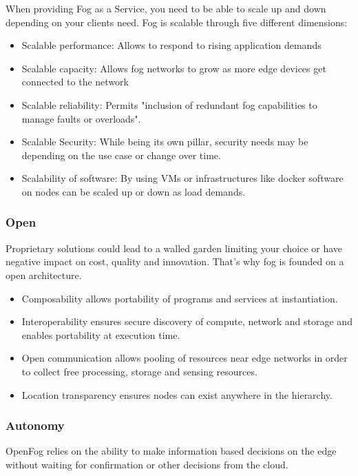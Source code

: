 When providing Fog as a Service, you need to be able to scale up and down depending on your clients need. Fog is scalable through five different dimensions:
\begin{itemize}
	\item Scalable performance: Allows to respond to rising application demands
	\item Scalable capacity: Allows fog networks to grow as more edge devices get connected to the network
	\item Scalable reliability: Permits "inclusion of redundant fog capabilities to manage faults or overloads".
	\item Scalable Security: While being its own pillar, security needs may be depending on the use case or change over time.
	\item Scalability of software: By using VMs or infrastructures like docker software on nodes can be scaled up or down as load demands.
\end{itemize}

\subsubsection{Open}

Proprietary solutions could lead to a walled garden limiting your choice or have negative impact on cost, quality and innovation. That's why fog is founded on a open architecture.

\begin{itemize}
	\item Composability allows portability of programs and services at instantiation. 
	\item Interoperability ensures secure discovery of compute, network and storage and enables portability at execution time.
	\item Open communication allows pooling of resources near edge networks in order to collect free processing, storage and sensing resources.
	\item Location transparency ensures nodes can exist anywhere in the hierarchy.
\end{itemize}

\subsubsection{Autonomy}

OpenFog relies on the ability to make information based decisions on the edge without waiting for confirmation or other decisions from the cloud. 

